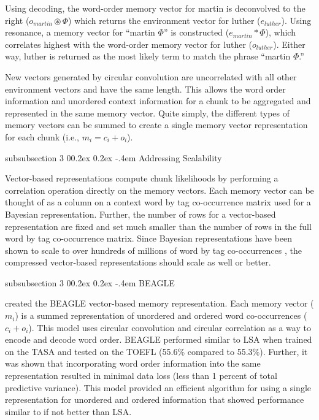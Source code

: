 \documentclass[man,floatsintext,donotrepeattitle]{apa6}
\makeatletter
\renewcommand{\subsubsection}{%
  \@startsection
  {subsubsection}%
  {3}%
  {\parindent}%
  {0\baselineskip \@plus 0.2ex \@minus 0.2ex}%
  {-.4em}%
  {\normalfont\normalsize\bfseries\addperi}}
\makeatother
\begin{document}
Using decoding, the word-order memory vector for martin is deconvolved to the right ($o_{martin} \circledast \Phi$) which returns the environment vector for luther ($e_{luther}$).
Using resonance, a memory vector for ``martin $\Phi$'' is constructed ($e_{martin} * \Phi$), which correlates highest with the word-order memory vector for luther ($o_{luther}$).
Either way, luther is returned as the most likely term to match the phrase ``martin $\Phi$.''

New vectors generated by circular convolution are uncorrelated with all other environment vectors and have the same length.
This allows the word order information and unordered context information for a chunk to be aggregated and represented in the same memory vector.
Quite simply, the different types of memory vectors can be summed to create a single memory vector representation for each chunk (i.e., $m_{i} = c_{i} + o_{i}$).

\subsubsection{Addressing Scalability}

Vector-based representations compute chunk likelihoods by performing a correlation operation directly on the memory vectors.
Each memory vector can be thought of as a column on a context word by tag co-occurrence matrix used for a Bayesian representation.
Further, the number of rows for a vector-based representation are fixed and set much smaller than the number of rows in the full word by tag co-occurrence matrix.
Since Bayesian representations have been shown to scale to over hundreds of millions of word by tag co-occurrences \parencite{Stanley2013}, the compressed vector-based representations should scale as well or better.

\subsubsection{BEAGLE}

\textcite{Jones2007} created the BEAGLE vector-based memory representation.
Each memory vector ($m_{i}$) is a summed representation of unordered and ordered word co-occurrences ($c_{i} + o_{i}$).
This model uses circular convolution and circular correlation as a way to encode and decode word order.
BEAGLE performed similar to LSA when trained on the TASA and tested on the TOEFL (\num{55.6}\% compared to \num{55.3}\%).
Further, it was shown that incorporating word order information into the same representation resulted in minimal data loss (less than 1 percent of total predictive variance).
This model provided an efficient algorithm for using a single representation for unordered and ordered information that showed performance similar to if not better than LSA.
\end{document}
